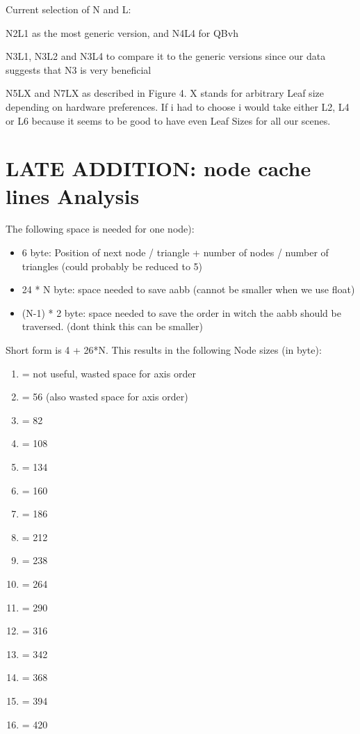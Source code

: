 \newpage

Current selection of N and L:

N2L1 as the most generic version, and N4L4 for QBvh

N3L1, N3L2 and N3L4 to compare it to the generic versions since our data suggests that N3 is very beneficial

N5LX and N7LX as described in Figure 4. X stands for arbitrary Leaf size depending on hardware preferences. If i had to choose i would take either L2, L4 or L6 because it seems to be good to have even Leaf Sizes for all our scenes.


\section{LATE ADDITION: node cache lines Analysis}

The following space is needed for one node):

\begin{itemize}
	\item 6 byte: Position of next node / triangle + number of nodes / number of triangles (could probably be reduced to 5)
	\item 24 * N byte: space needed to save aabb (cannot be smaller when we use float)
	\item (N-1) * 2 byte: space needed to save the order in witch the aabb should be traversed. (dont think this can be smaller)
\end{itemize}
Short form is 4 + 26*N.
This results in the following Node sizes (in byte):
\begin{enumerate}[label=\arabic*]
	\item = not useful, wasted space for axis order
	\item = 56 (also wasted space for axis order)
	\item = 82
	\item = 108
	\item = 134
	\item = 160
	\item = 186
	\item = 212
	\item = 238
	\item = 264
	\item = 290
	\item = 316
	\item = 342
	\item = 368
	\item = 394
	\item = 420
	
\end{enumerate}

